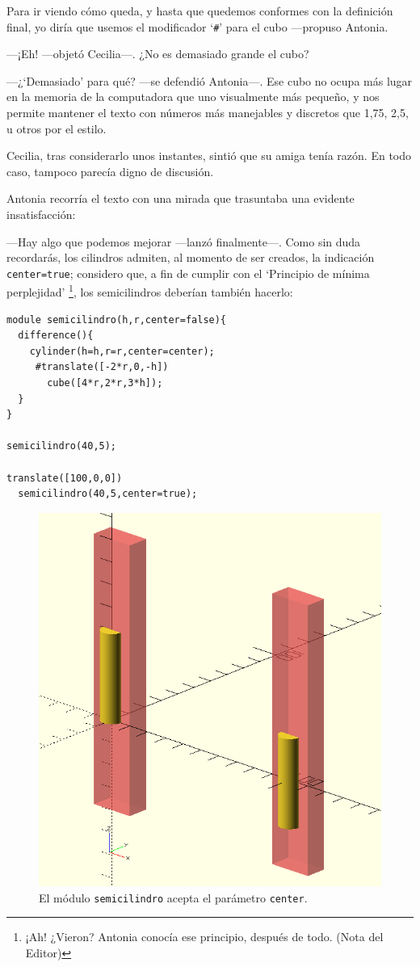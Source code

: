     \guillemotright Para ir viendo cómo queda, y hasta que quedemos
    conformes con la definición final, yo diría que usemos el
    modificador `\lstinline!#!' para el cubo ---propuso Antonia.

    ---¡Eh! ---objetó Cecilia---. ¿No es demasiado grande el cubo?

    ---¿`Demasiado' para qué? ---se defendió Antonia---. Ese cubo no
    ocupa más lugar en la memoria de la computadora que uno
    visualmente más pequeño, y nos permite mantener el texto con
    números más manejables y discretos que 1,75, 2,5, u otros por el
    estilo.

    Cecilia, tras considerarlo unos instantes, sintió que su amiga
    tenía razón. En todo caso, tampoco parecía digno de discusión.

  Antonia recorría el texto con una mirada que trasuntaba una evidente
  insatisfacción:

  ---Hay algo que podemos mejorar ---lanzó finalmente---. Como sin
  duda recordarás, los cilindros admiten, al momento de ser creados,
  la indicación \lstinline!center=true!; considero que, a fin de
  cumplir con el `Principio de mínima perplejidad' \footnote{¡Ah!
    ¿Vieron? Antonia conocía ese principio, después de todo. (Nota del
    Editor)}, los semicilindros deberían también hacerlo:

    \begin{lstlisting}
module semicilindro(h,r,center=false){
  difference(){
    cylinder(h=h,r=r,center=center);
     #translate([-2*r,0,-h])
       cube([4*r,2*r,3*h]);
  }
}

semicilindro(40,5);

translate([100,0,0])
  semicilindro(40,5,center=true);
    \end{lstlisting}

    
    \begin{figure}[ht]
      \centering
      \includegraphics[width=.5\textwidth]{imagenes/semicilindros-center}      
      \caption{El módulo \texttt{semicilindro} acepta el parámetro \texttt{center}.}
      \label{fig:semicilindro-center}
    \end{figure}



